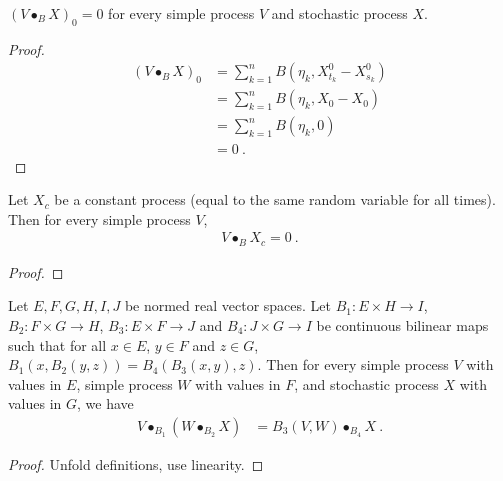 \begin{lemma}\label{lem:elemStochIntegralBilin_zero}
  \leanok
$(V \bullet_B X)_0 = 0$ for every simple process $V$ and stochastic process $X$.
\end{lemma}

\begin{proof}
  \leanok
\begin{align*}
  (V \bullet_B X)_0
  &= \sum_{k=1}^{n} B (\eta_k, X^0_{t_k} - X^0_{s_k})
  \\
  &= \sum_{k=1}^{n} B (\eta_k, X_{0} - X_{0})
  \\
  &= \sum_{k=1}^{n} B (\eta_k, 0)
  \\
  &= 0
  \: .
\end{align*}
\end{proof}


\begin{lemma}\label{lem:elemStochIntegralBilin_const}
  \leanok
Let $X_c$ be a constant process (equal to the same random variable for all times).
Then for every simple process $V$,
\begin{align*}
  V \bullet_B X_c = 0
  \: .
\end{align*}
\end{lemma}

\begin{proof}
  \leanok
\end{proof}


\begin{lemma}\label{lem:elemStochIntegralBilin_assoc}
  \leanok
Let $E, F, G, H, I, J$ be normed real vector spaces.
Let $B_1 : E \times H \to I$, $B_2 : F \times G \to H$, $B_3 : E \times F \to J$ and $B_4 : J \times G \to I$ be continuous bilinear maps such that for all $x \in E$, $y \in F$ and $z \in G$, $B_1(x, B_2(y, z)) = B_4(B_3(x, y), z)$.
Then for every simple process $V$ with values in $E$, simple process $W$ with values in $F$, and stochastic process $X$ with values in $G$, we have
\begin{align*}
  V \bullet_{B_1} (W \bullet_{B_2} X)
  &= B_3(V, W) \bullet_{B_4} X
  \: .
\end{align*}
\end{lemma}

\begin{proof}
  \leanok
Unfold definitions, use linearity.
\end{proof}


